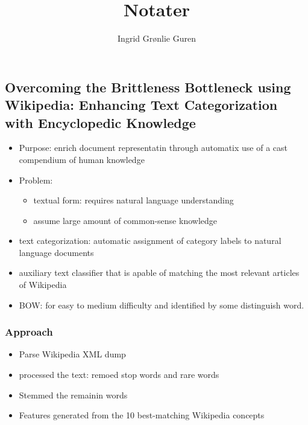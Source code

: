 \documentclass[11pt,english,a4paper]{article}
\title{Notater}
\author{Ingrid Grønlie Guren}
\begin{document}
\maketitle


\subsection*{Overcoming the Brittleness Bottleneck using Wikipedia: Enhancing Text Categorization with Encyclopedic Knowledge}
 \begin{itemize}
 \item Purpose: enrich document representatin through automatix use of a cast compendium of human knowledge
 \item Problem: 
    \begin{itemize}
    \item textual form: requires natural language understanding
    \item assume large amount of common-sense knowledge
    \end{itemize}
    \item text categorization: automatic assignment of category labels to natural language documents
    \item auxiliary text classifier that is apable of matching the most relevant articles of Wikipedia
    \item BOW: for easy to medium difficulty and identified by some distinguish word. 
 \end{itemize}
\subsubsection*{Approach}
\begin{itemize}
\item Parse Wikipedia XML dump
\item processed the text: remoed stop words and rare words
\item Stemmed the remainin words
\item Features generated from the 10 best-matching Wikipedia concepts
\end{itemize}
\end{document}
